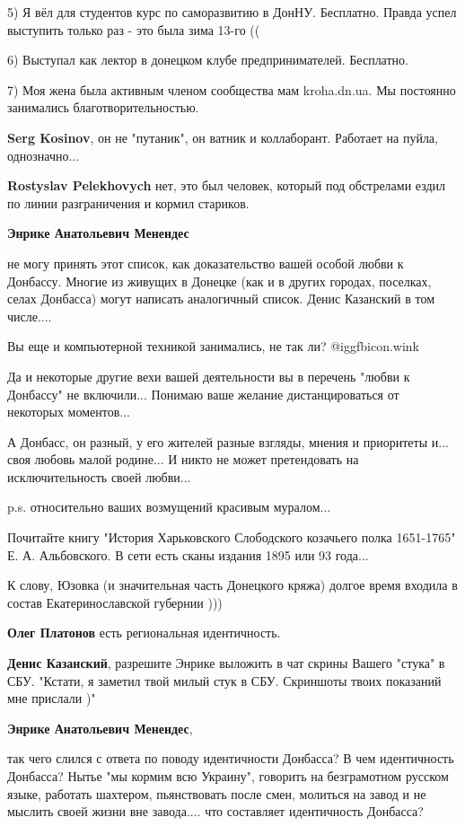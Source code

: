 \begin{itemize}
\begin{itemize}
5) Я вёл для студентов курс по саморазвитию в ДонНУ. Бесплатно. Правда успел выступить только раз - это была зима 13-го ((

6) Выступал как лектор в донецком клубе предпринимателей. Бесплатно.

7) Моя жена была активным членом сообщества мам kroha.dn.ua. Мы постоянно занимались благотворительностью.

\textbf{Serg Kosinov}, он не "путаник", он ватник и коллаборант. Работает на пуйла, однозначно...

\textbf{Rostyslav Pelekhovych} нет, это был человек, который под обстрелами ездил по линии разграничения и кормил стариков.

\textbf{Энрике Анатольевич Менендес} 

не могу принять этот список, как доказательство вашей особой любви к Донбассу.
Многие из живущих в Донецке (как и в других городах, поселках, селах Донбасса)
могут написать аналогичный список. Денис Казанский в том числе....

Вы еще и компьютерной техникой занимались, не так ли?  @igg{fbicon.wink} 

Да и некоторые другие вехи вашей деятельности вы в перечень "любви к Донбассу"
не включили... Понимаю ваше желание дистанцироваться от некоторых моментов...

А Донбасс, он разный, у его жителей разные взгляды, мнения и приоритеты и...
своя любовь малой родине... И никто не может претендовать на исключительность
своей любви...

p.s. относительно ваших возмущений красивым муралом...

Почитайте книгу "История Харьковского Слободского козачьего полка 1651-1765" Е.
А. Альбовского. В сети есть сканы издания 1895 или 93 года...

К слову, Юзовка (и значительная часть Донецкого кряжа) долгое время входила в
состав Екатеринославской губернии )))

\textbf{Олег Платонов} есть региональная идентичность.

\textbf{Денис Казанский}, разрешите Энрике выложить в чат скрины Вашего "стука" в СБУ.
"Кстати, я заметил твой милый стук в СБУ. Скриншоты твоих показаний мне прислали )"

\textbf{Энрике Анатольевич Менендес}, 

так чего слился с ответа по поводу идентичности Донбасса? В чем идентичность
Донбасса? Нытье "мы кормим всю Украину", говорить на безграмотном русском
языке, работать шахтером, пьянствовать после смен, молиться на завод и не
мыслить своей жизни вне завода.... что составляет идентичность Донбасса?


\end{itemize}
\end{itemize}
